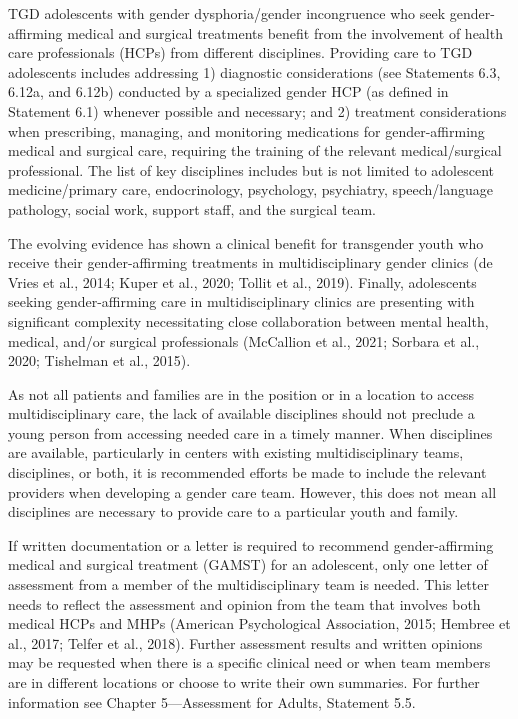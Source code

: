 \documentclass[
]{book}
\begin{document}
TGD adolescents with gender dysphoria/gender incongruence who seek gender-affirming
medical and surgical treatments benefit from
the involvement of health care professionals
(HCPs) from different disciplines. Providing care
to TGD adolescents includes addressing 1) diagnostic considerations (see Statements 6.3, 6.12a,
and 6.12b) conducted by a specialized gender
HCP (as defined in Statement 6.1) whenever
possible and necessary; and 2) treatment considerations when prescribing, managing, and
monitoring medications for gender-affirming
medical and surgical care, requiring the training
of the relevant medical/surgical professional. The
list of key disciplines includes but is not limited
to adolescent medicine/primary care, endocrinology, psychology, psychiatry, speech/language
pathology, social work, support staff, and the
surgical team.

The evolving evidence has shown a clinical
benefit for transgender youth who receive their
gender-affirming treatments in multidisciplinary
gender clinics (de Vries et al., 2014; Kuper et al.,
2020; Tollit et al., 2019). Finally, adolescents seeking gender-affirming care in multidisciplinary
clinics are presenting with significant complexity
necessitating close collaboration between mental
health, medical, and/or surgical professionals
(McCallion et al., 2021; Sorbara et al., 2020;
Tishelman et al., 2015).

As not all patients and families are in the position or in a location to access multidisciplinary
care, the lack of available disciplines should not
preclude a young person from accessing needed
care in a timely manner. When disciplines are
available, particularly in centers with existing
multidisciplinary teams, disciplines, or both, it is
recommended efforts be made to include the relevant providers when developing a gender care
team. However, this does not mean all disciplines
are necessary to provide care to a particular
youth and family.

If written documentation or a letter is required
to recommend gender-affirming medical and surgical treatment (GAMST) for an adolescent, only
one letter of assessment from a member of the
multidisciplinary team is needed. This letter needs
to reflect the assessment and opinion from the team
that involves both medical HCPs and MHPs
(American Psychological Association, 2015; Hembree
et al., 2017; Telfer et al., 2018). Further assessment
results and written opinions may be requested when
there is a specific clinical need or when team members are in different locations or choose to write
their own summaries. For further information see
Chapter 5---Assessment for Adults, Statement 5.5.
\end{document}
